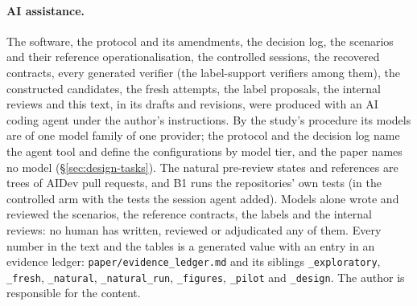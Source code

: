 \paragraph{AI assistance.} The software, the protocol and its amendments, the decision log, the scenarios and their reference operationalisation, the controlled sessions, the recovered contracts, every generated verifier (the label-support verifiers among them), the constructed candidates, the fresh attempts, the label proposals, the internal reviews and this text, in its drafts and revisions, were produced with an AI coding agent under the author's instructions. By the study's procedure its models are of one model family of one provider; the protocol and the decision log name the agent tool and define the configurations by model tier, and the paper names no model (\S\ref{sec:design-tasks}). The natural pre-review states and references are trees of AIDev pull requests, and B1 runs the repositories' own tests (in the controlled arm with the tests the session agent added). Models alone wrote and reviewed the scenarios, the reference contracts, the labels and the internal reviews: no human has written, reviewed or adjudicated any of them. Every number in the text and the tables is a generated value with an entry in an evidence ledger: \texttt{paper/evidence\_ledger.md} and its siblings \texttt{\_exploratory}, \texttt{\_fresh}, \texttt{\_natural}, \texttt{\_natural\_run}, \texttt{\_figures}, \texttt{\_pilot} and \texttt{\_design}. The author is responsible for the content.
